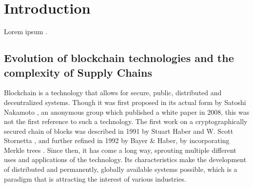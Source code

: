 \chapter{Introduction}
\label{chap:introduction}


Lorem ipsum \cite{ferreira_patterns_2008}.




\section{Evolution of blockchain technologies and the complexity of Supply Chains} \label{sec:context}

Blockchain is a technology that allows for secure, public, distributed and decentralized systems. Though it was first proposed in its actual form by Satoshi Nakamoto \cite{Nakamoto2008}, an anonymous group which published a white paper in 2008, this was not the first reference to such a technology. The first work on a cryptographically secured chain of blocks was described in 1991 by Stuart Haber and W. Scott Stornetta \cite{Haber1991}, and further refined in 1992 by Bayer \& Haber, by incorporating Merkle trees \cite{Bayer1992}. Since then, it has come a long way, sprouting multiple different uses and applications of the technology. Its characteristics make the development of distributed and permanently, globally available systems possible, which is a paradigm that is attracting the interest of various industries.

